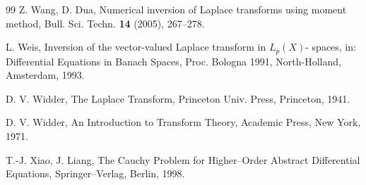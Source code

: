 \documentclass{amsart}
\theoremstyle{definition}
\theoremstyle{remark}
\numberwithin{equation}{section}
\begin{document}
\begin{thebibliography}{99}
Z. Wang, D. Dua,
Numerical inversion of Laplace transforms using moment method,
Bull. Sci. Techn. {\bf 14} (2005), 267--278.

L. Weis, 
Inversion of the vector-valued Laplace transform in $L_{p}(X)$-
spaces,
in: Differential Equations in Banach Spaces, Proc. Bologna 1991,
North-Holland, Amsterdam, 1993.

D. V. Widder,
The Laplace Transform, 
Princeton Univ. Press, Princeton,
1941.

D. V. Widder,
An Introduction to Transform Theory,
Academic Press,
New York, 1971.

T.-J. Xiao, J. Liang,
The Cauchy Problem for Higher--Order
Abstract Differential Equations, 
Springer--Verlag, Berlin, 1998.

\end{thebibliography}
\end{document}
